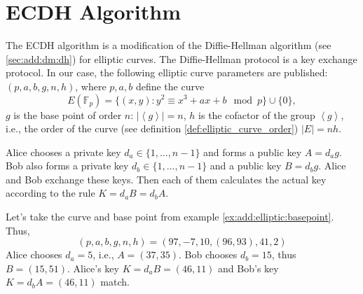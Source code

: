 \section{ECDH Algorithm}

The ECDH algorithm is a modification of the Diffie-Hellman algorithm (see \autoref{sec:add:dm:dh}) for elliptic curves. The Diffie-Hellman protocol is a key exchange protocol. In our case, the following elliptic curve parameters are published: $(p,a,b,g,n,h)$, where $p,a,b$ define the curve 
\[
E\left(\mathbb{F}_p\right) = \{(x,y): y^2 \equiv x^3 +a x + b \mod p
\} \cup \{0\},
\]
$g$ is the base point of order $n$: $\left|\left<g\right>\right| = n$,
$h$ is the cofactor of the group $\left<g\right>$, i.e., the order of the curve (see definition \ref{def:elliptic_curve_order}) $\left|E\right| = nh$.

Alice chooses a private key $d_a \in \{1, \dots, n - 1\}$ and forms a public key $A = d_a g$. Bob also forms a private key $d_b \in \{1, \dots, n - 1\}$ and a public key $B = d_b g$. Alice and Bob exchange these keys. Then each of them calculates the actual key according to the rule $K = d_a B = d_b A$. 

\begin{example}
\label{ex:add:discretmath:ecdh}
Let's take the curve and base point from example \ref{ex:add:elliptic:basepoint}. Thus, 
\[
(p,a,b,g,n,h) = (97, -7, 10, (96,93), 41, 2)
\]
Alice chooses $d_a = 5$, i.e., 
$A = (37, 35)$. Bob chooses $d_b = 15$, thus $B = (15,51)$. Alice's key $K = d_a B = (46,11)$ and Bob's key $K = d_b A = (46,11)$ match. 
\end{example}